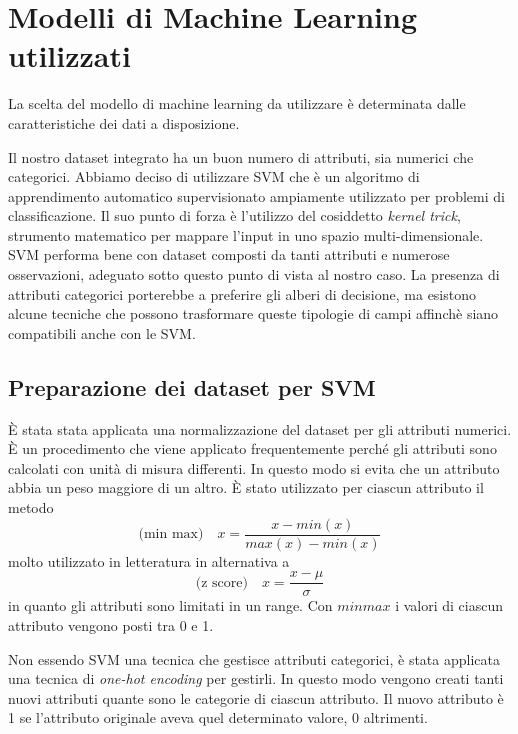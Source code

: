 \section{Modelli di Machine Learning utilizzati}



La scelta del modello di machine learning da utilizzare è determinata dalle caratteristiche dei dati a disposizione.

Il nostro dataset integrato ha un buon numero di attributi, sia numerici che categorici.
Abbiamo deciso di utilizzare SVM che è un algoritmo di apprendimento automatico supervisionato ampiamente utilizzato per problemi di classificazione. Il suo punto di forza è l'utilizzo del cosiddetto \textit{kernel trick}, strumento matematico per mappare l'input in uno spazio multi-dimensionale. SVM performa bene con dataset composti da tanti attributi e numerose osservazioni, adeguato sotto questo punto di vista al nostro caso.
La presenza di attributi categorici porterebbe a preferire gli alberi di decisione, ma esistono alcune tecniche che possono trasformare queste tipologie di campi affinchè siano compatibili anche con le SVM.

\subsection{Preparazione dei dataset per SVM}
\par
È stata stata applicata una normalizzazione del dataset per gli attributi numerici. È un procedimento che viene applicato frequentemente perché gli attributi sono calcolati con unità di misura differenti. In questo modo si evita che un attributo abbia un peso maggiore di un altro. È stato utilizzato per ciascun attributo il metodo
$$ \text{(min max)}\quad x = \dfrac{x - min(x)}{max(x) - min(x)} $$ 
molto utilizzato in letteratura in alternativa a
$$\text{(z score)}\quad x = \dfrac{x - \mu}{\sigma} $$
 in quanto gli attributi sono limitati in un range. Con $min max$ i valori di ciascun attributo vengono posti tra 0 e 1.

\par
Non essendo SVM una tecnica che gestisce attributi categorici, è stata applicata una tecnica di \textit{one-hot encoding} per gestirli. In questo modo vengono creati tanti nuovi attributi quante sono le categorie di ciascun attributo. Il nuovo attributo è 1 se l’attributo originale aveva quel determinato valore, 0 altrimenti.

